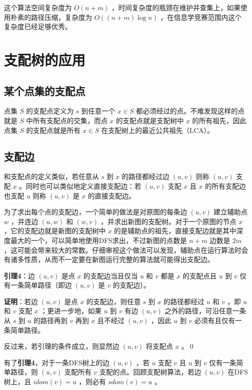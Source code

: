 \documentclass{noithesis}
\begin{document}
这个算法空间复杂度为 $O(n+m)$ ，时间复杂度的瓶颈在维护并查集上，如果使用朴素的路径压缩，复杂度为 $O((n+m)\log n)$ ，在信息学竞赛范围内这个复杂度已经足够优秀。

\section{支配树的应用}

\subsection{某个点集的支配点}

点集 $S$ 的支配点定义为 $s$ 到任意一个 $x\in S$ 都必须经过的点。不难发现这样的点就是 $S$ 中所有支配点的交集，而点 $x$ 的支配点就是支配树中 $x$ 的所有祖先，因此点集 $S$ 的支配点就是所有 $x\in S$ 在支配树上的最近公共祖先（LCA）。

\subsection{支配边}

和支配点的定义类似，若任意从 $s$ 到 $x$ 的路径都经过边 $(u,v)$ 则称 $(u, v)$ 支配 $x$ 。同时也可以类似地定义直接支配边：若 $(u,v)$ 支配 $x$ 且 $x$ 的所有支配边也支配 $u$ 则称 $(u,v)$ 是 $x$ 的直接支配边。

为了求出每个点的支配边，一个简单的做法是对原图的每条边 $(u,v)$ 建立辅助点 $w$ ，并连边 $(u,w)$ 和 $(w,v)$ ，并求出新图的支配树。对于一个原图的节点 $x$ ，它的支配边就是新图的支配树中 $x$ 的是辅助点的祖先，直接支配边就是其中深度最大的一个，可以简单地使用DFS求出，不过新图的点数是 $n+m$ 边数是 $2m$ ，这可能会带来较大的常数。仔细审视这个做法可以发现，辅助点在运行算法时会有诸多性质，从而不一定要在新图运行完整的算法就可能得出支配边。

\textbf{引理4}：边 $(u,v)$ 是点 $x$ 的支配边当且仅当 $u$ 和 $v$ 都是 $x$ 的支配点且 $u$ 到 $v$ 仅有一条简单路径（即边 $(u,v)$ 是 $v$ 的支配边）。

\textbf{证明}：若边 $(u,v)$ 是点 $x$ 的支配边，则任意 $s$ 到 $x$ 的路径都经过 $u$ 和 $v$ ，即 $u$ 和 $v$ 支配 $x$ ；更进一步地，如果 $u$ 到 $v$ 有边 $(u,v)$ 之外的路径，可沿任意一条从 $s$ 到 $u$ 的路径再到 $v$ 再到 $x$ 且不经过 $(u,v)$ ，因此 $u$ 到 $v$ 必须有且仅有一条简单路径。

反过来，若引理的条件成立，则显然边 $(u,v)$ 将支配点 $x$ 。\qed

有了\textbf{引理4}，对于一条DFS树上的边 $(u,v)$ ，若 $u$ 支配 $v$ 且 $u$ 到 $v$ 仅有一条简单路径，则 $(u,v)$ 支配所有 $v$ 支配的点。回顾支配树算法，若边 $(u,v)$ 在DFS树上，且 $idom(v) = u$ ，则必有 $sdom(v) = u$ 。
\end{document}

